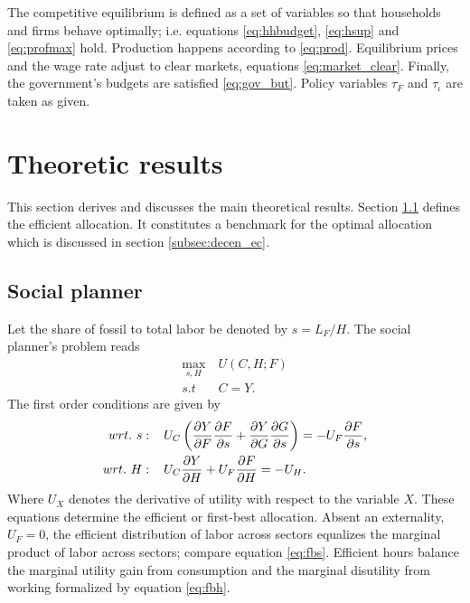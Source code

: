 The competitive equilibrium is defined as a set of variables so that households and firms behave optimally; i.e. equations \ref{eq:hhbudget}, \ref{eq:hsup} and \ref{eq:profmax} hold. Production happens according to \ref{eq:prod}.  Equilibrium prices and the wage rate adjust to clear markets, equations \ref{eq:market_clear}. Finally, the government's budgets are satisfied \ref{eq:gov_but}. Policy variables $\tau_F$ and $\tau_\iota$ are taken as given. 

\section{Theoretic results}\label{sec:theory}
This section derives and discusses the main theoretical results. Section \ref{subsec:sp} defines the efficient allocation. It constitutes a benchmark for the optimal allocation which is discussed in section \ref{subsec:decen_ec}. 
\subsection{Social planner}\label{subsec:sp}
Let the share of fossil to total labor be denoted by $s=L_F/H$. The social planner's problem reads
\begin{align}
\underset{s, H}{\max}\ & U(C,H; F)\\ s.t\ \ & C=Y.
\end{align}
The first order conditions are given by
\begin{align}
wrt.\ s:\hspace{4mm} & U_C\left(\frac{\partial{Y}}{\partial{F}}\frac{\partial{F}}{\partial{s}}+\frac{\partial{Y}}{\partial{G}}\frac{\partial{G}}{\partial{s}}\right)=-U_F\frac{\partial{F}}{\partial{s}}, \label{eq:fbs}
\\
wrt.\ H:\hspace{4mm} & U_C\frac{\partial{Y}}{\partial{H}}+U_F\frac{\partial{F}}{\partial{H}}=-U_H\label{eq:fbh}. 
\end{align}
Where $U_X$ denotes the derivative of utility with respect to the variable $X$.
These equations determine the efficient or first-best allocation. 
Absent an externality, $U_F=0$, the efficient distribution of labor across sectors equalizes the marginal product of labor across sectors; compare equation \ref{eq:fbs}. Efficient hours balance the marginal utility gain from consumption and the marginal disutility from working formalized by equation \ref{eq:fbh}. 

